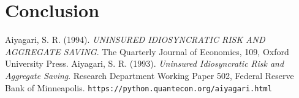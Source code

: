 \documentclass[12pt]{article}
\begin{document}
\section{Conclusion}

\newpage
\begin{thebibliography}{99}
 {\sc Aiyagari, S. R.} (1994). \textit{UNINSURED IDIOSYNCRATIC RISK AND AGGREGATE SAVING}. The Quarterly Journal of Economics, 109, Oxford University Press.
 {\sc Aiyagari, S. R.} (1993). \textit{Uninsured Idiosyncratic Risk and Aggregate Saving}. Research Department Working Paper 502, Federal Reserve Bank of Minneapolis.
 \texttt{https://python.quantecon.org/aiyagari.html}
\end{thebibliography}
\end{document}
